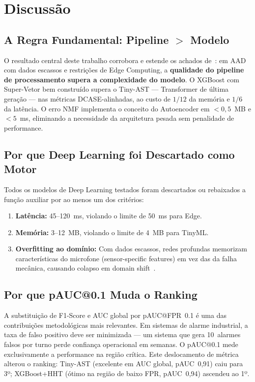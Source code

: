 \section{Discussão}
\color{black}

\subsection{A Regra Fundamental: Pipeline $>$ Modelo}

O resultado central deste trabalho corrobora e estende os achados de~\cite{Khamaisi2025}: em AAD com
dados escassos e restrições de Edge Computing, a \textbf{qualidade do pipeline de processamento supera
a complexidade do modelo}. O XGBoost com Super-Vetor bem construído supera o Tiny-AST --- Transformer
de última geração --- nas métricas DCASE-alinhadas, ao custo de $1/12$ da memória e $1/6$ da latência.
O erro NMF implementa o conceito do Autoencoder em $<0{,}5$~MB e $<5$~ms, eliminando a necessidade da
arquitetura pesada sem penalidade de performance.

\subsection{Por que Deep Learning foi Descartado como Motor}

Todos os modelos de Deep Learning testados foram descartados ou rebaixados a função auxiliar por ao
menos um dos critérios:
\begin{enumerate}
    \item \textbf{Latência:} 45--120~ms, violando o limite de 50~ms para Edge.
    \item \textbf{Memória:} 3--12~MB, violando o limite de 4~MB para TinyML.
    \item \textbf{Overfitting ao domínio:} Com dados escassos, redes profundas memorizam
    características do microfone (sensor-specific features) em vez das da falha mecânica, causando
    colapso em domain shift~\cite{Harada2023}.
\end{enumerate}

\subsection{Por que pAUC@0.1 Muda o Ranking}

A substituição de F1-Score e AUC global por pAUC@FPR~0.1 é uma das contribuições metodológicas mais
relevantes. Em sistemas de alarme industrial, a taxa de falso positivo deve ser minimizada --- um
sistema que gera 10~alarmes falsos por turno perde confiança operacional em semanas. O pAUC@0.1 mede
exclusivamente a performance na região crítica. Este deslocamento de métrica alterou o ranking: Tiny-AST
(excelente em AUC global, pAUC~0,91) caiu para 3º; XGBoost+HHT (ótimo na região de baixo FPR,
pAUC~0,94) ascendeu ao 1º.

